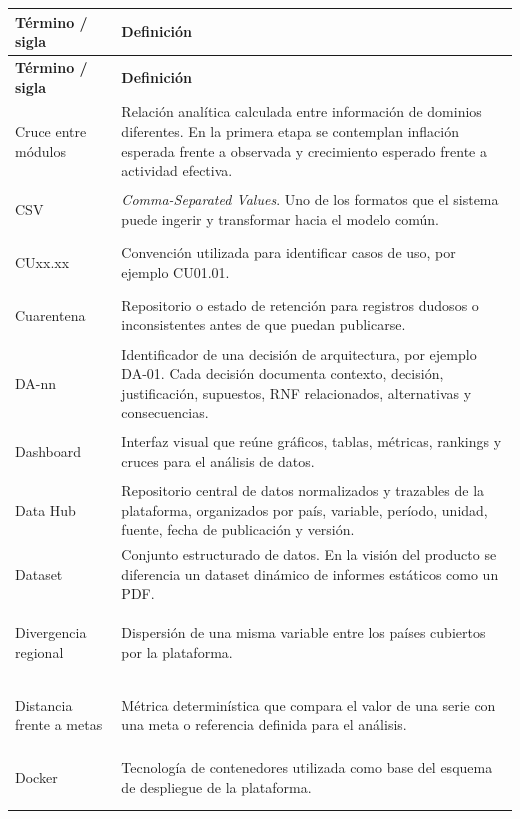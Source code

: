 \documentclass[11pt,a4paper]{article}
\makeatletter
\newenvironment{glosario}{%
  \renewcommand{\arraystretch}{1.18}%
  \begin{longtable}{@{}>{\raggedright\arraybackslash\bfseries}p{4.0cm} >{\raggedright\arraybackslash}p{10.7cm}@{}}
  \toprule
  \textbf{T\'ermino / sigla} & \textbf{Definici\'on} \\
  \midrule
  \endfirsthead
  \toprule
  \textbf{T\'ermino / sigla} & \textbf{Definici\'on} \\
  \midrule
  \endhead
  \bottomrule
  \endfoot
}{%
  \end{longtable}
  \renewcommand{\arraystretch}{1}%
}
\makeatother
\begin{document}
\begin{glosario}
Cruce entre m\'odulos & Relaci\'on anal\'itica calculada entre informaci\'on de dominios diferentes. En la primera etapa se contemplan inflaci\'on esperada frente a observada y crecimiento esperado frente a actividad efectiva. \\
\addlinespace

CSV & \emph{Comma-Separated Values}. Uno de los formatos que el sistema puede ingerir y transformar hacia el modelo com\'un. \\
\addlinespace

CUxx.xx & Convenci\'on utilizada para identificar casos de uso, por ejemplo CU01.01. \\
\addlinespace

Cuarentena & Repositorio o estado de retenci\'on para registros dudosos o inconsistentes antes de que puedan publicarse. \\
\addlinespace

DA-nn & Identificador de una decisi\'on de arquitectura, por ejemplo DA-01. Cada decisi\'on documenta contexto, decisi\'on, justificaci\'on, supuestos, RNF relacionados, alternativas y consecuencias. \\
\addlinespace

Dashboard & Interfaz visual que re\'une gr\'aficos, tablas, m\'etricas, rankings y cruces para el an\'alisis de datos. \\
\addlinespace

Data Hub & Repositorio central de datos normalizados y trazables de la plataforma, organizados por pa\'is, variable, per\'iodo, unidad, fuente, fecha de publicaci\'on y versi\'on. \\
\addlinespace

Dataset & Conjunto estructurado de datos. En la visi\'on del producto se diferencia un dataset din\'amico de informes est\'aticos como un PDF. \\
\addlinespace

Divergencia regional & Dispersi\'on de una misma variable entre los pa\'ises cubiertos por la plataforma. \\
\addlinespace

Distancia frente a metas & M\'etrica determin\'istica que compara el valor de una serie con una meta o referencia definida para el an\'alisis. \\
\addlinespace

Docker & Tecnolog\'ia de contenedores utilizada como base del esquema de despliegue de la plataforma. \\
\addlinespace


\end{glosario}
\end{document}
